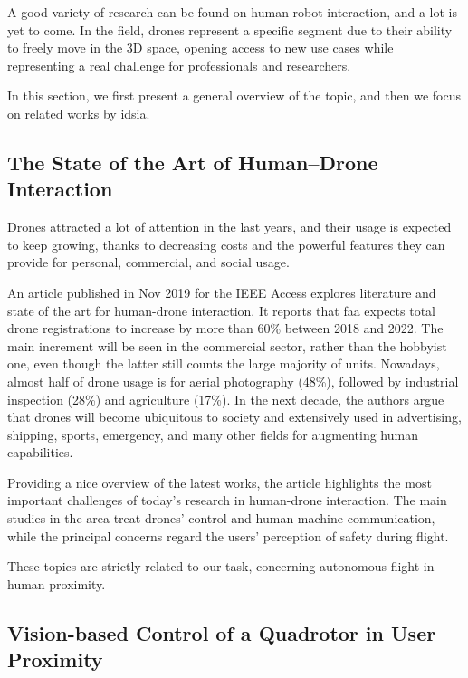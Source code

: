 A good variety of research can be found on human-robot interaction, and a lot is yet to come. In the field, drones represent a specific segment due to their ability to freely move in the 3D space, opening access to new use cases while representing a real challenge for professionals and researchers.

In this section, we first present a general overview of the topic, and then we focus on related works by \gls{idsia}.



\subsection{The State of the Art of Human–Drone Interaction}
\label{subsec:human-drone-sota}

Drones attracted a lot of attention in the last years, and their usage is expected to keep growing, thanks to decreasing costs and the powerful features they can provide for personal, commercial, and social usage.

An article published in Nov 2019 for the IEEE Access \cite{human-drone-sota} explores literature and state of the art for human-drone interaction. It reports that \gls{faa} expects total drone registrations to increase by more than 60\% between 2018 and 2022. The main increment will be seen in the commercial sector, rather than the hobbyist one, even though the latter still counts the large majority of units. Nowadays, almost half of drone usage is for aerial photography (48\%), followed by industrial inspection (28\%) and agriculture (17\%). In the next decade, the authors argue that drones will become ubiquitous to society and extensively used in advertising, shipping, sports, emergency, and many other fields for augmenting human capabilities.

Providing a nice overview of the latest works, the article highlights the most important challenges of today's research in human-drone interaction. The main studies in the area treat drones' control and human-machine communication, while the principal concerns regard the users' perception of safety during flight.

These topics are strictly related to our task, concerning autonomous flight in human proximity.



\subsection{Vision-based Control of a Quadrotor in User Proximity}
\label{subsec:sota-dario}

